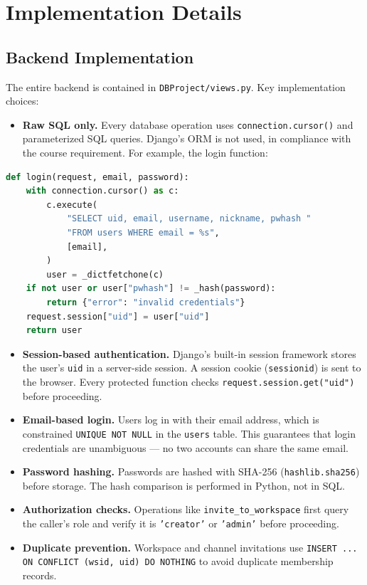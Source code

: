 \documentclass[11pt]{article}
\begin{document}
\newpage
\section{Implementation Details}
\label{sec:impl}

\subsection{Backend Implementation}

The entire backend is contained in \texttt{DBProject/views.py}. Key implementation choices:

\begin{itemize}
    \item \textbf{Raw SQL only.} Every database operation uses \texttt{connection.cursor()} and parameterized SQL queries. Django's ORM is not used, in compliance with the course requirement. For example, the login function:
\end{itemize}

\begin{lstlisting}[language=Python]
def login(request, email, password):
    with connection.cursor() as c:
        c.execute(
            "SELECT uid, email, username, nickname, pwhash "
            "FROM users WHERE email = %s",
            [email],
        )
        user = _dictfetchone(c)
    if not user or user["pwhash"] != _hash(password):
        return {"error": "invalid credentials"}
    request.session["uid"] = user["uid"]
    return user
\end{lstlisting}

\begin{itemize}
    \item \textbf{Session-based authentication.} Django's built-in session framework stores the user's \texttt{uid} in a server-side session. A session cookie (\texttt{sessionid}) is sent to the browser. Every protected function checks \texttt{request.session.get("uid")} before proceeding.
    \item \textbf{Email-based login.} Users log in with their email address, which is constrained \texttt{UNIQUE NOT NULL} in the \texttt{users} table. This guarantees that login credentials are unambiguous --- no two accounts can share the same email.
    \item \textbf{Password hashing.} Passwords are hashed with SHA-256 (\texttt{hashlib.sha256}) before storage. The hash comparison is performed in Python, not in SQL.
    \item \textbf{Authorization checks.} Operations like \texttt{invite\_to\_workspace} first query the caller's role and verify it is \texttt{'creator'} or \texttt{'admin'} before proceeding.
    \item \textbf{Duplicate prevention.} Workspace and channel invitations use \texttt{INSERT ... ON CONFLICT (wsid, uid) DO NOTHING} to avoid duplicate membership records.
\end{itemize}
\end{document}
